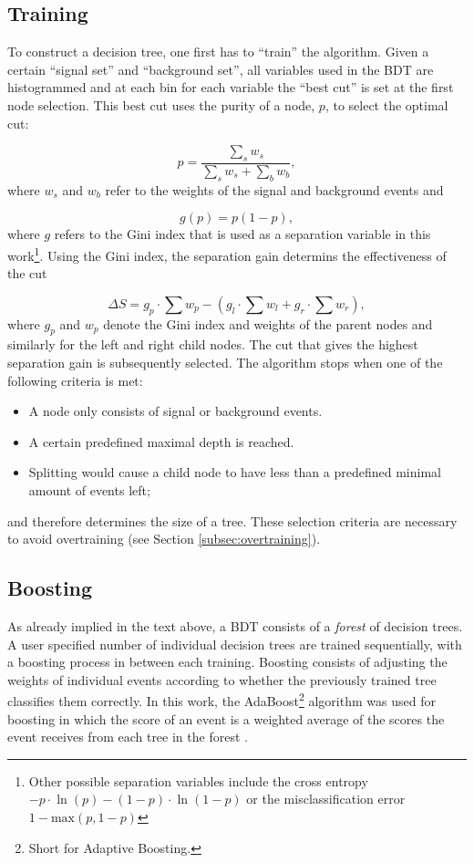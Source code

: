 \subsection{Training}
\label{subsec:training}
To construct a decision tree, one first has to ``train'' the algorithm. Given a certain ``signal set'' and ``background set'', all variables used in the BDT are histogrammed and at each bin for each variable the ``best cut'' is set at the first node selection. This best cut uses the purity of a node, $p$, to select the optimal cut:

\begin{equation}
p = \frac{\sum_s w_s}{\sum_s w_s + \sum_b w_b},
\end{equation}
\noindent where $w_s$ and $w_b$ refer to the weights of the signal and background events and

\begin{equation}
g(p) = p(1-p), 
\end{equation}
where $g$ refers to the Gini index that is used as a separation variable in this work\footnote{Other possible separation variables include the cross entropy $-p \cdot \ln(p)-(1-p) \cdot \ln(1-p)$ or the misclassification error $1-\textrm{max}(p,1-p)$}. Using the Gini index, the separation gain determins the effectiveness of the cut

\begin{equation}
\label{eq:separationgain}
\Delta S = g_p \cdot \sum w_p - \left(g_l \cdot \sum w_l + g_r \cdot \sum w_r\right),
\end{equation}
\noindent where $g_p$ and $w_p$ denote the Gini index and weights of the parent nodes and similarly for the left and right child nodes. The cut that gives the highest separation gain is subsequently selected. The algorithm stops when one of the following criteria is met:

\begin{itemize}
\item A node only consists of signal or background events.
\item A certain predefined maximal depth is reached.
\item Splitting would cause a child node to have less than a predefined minimal amount of events left;  
\end{itemize}
and therefore determines the size of a tree. These selection criteria are necessary to avoid overtraining (see Section \ref{subsec:overtraining}).

\subsection{Boosting}
As already implied in the text above, a BDT consists of a \textit{forest} of decision trees. A user specified number of individual decision trees are trained sequentially, with a boosting process in between each training. Boosting consists of adjusting the weights of individual events according to whether the previously trained tree classifies them correctly. In this work, the AdaBoost\footnote{Short for Adaptive Boosting.} algorithm was used for boosting in which the score of an event is a weighted average of the scores the event receives from each tree in the forest \cite{FREUND1997119}.

